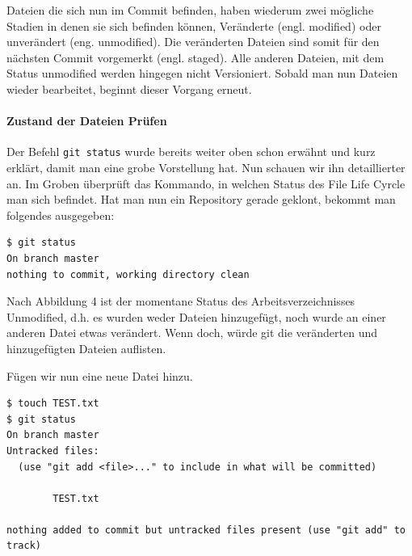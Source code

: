 \documentclass[12pt,a4paper,bibliography=totocnumbered,listof=totocnumbered]{scrartcl}
\begin{document}
Dateien die sich nun im Commit befinden, haben wiederum zwei mögliche Stadien in denen sie sich befinden können, Veränderte (engl. modified) oder unverändert (eng. unmodified). Die veränderten Dateien sind somit für den nächsten Commit vorgemerkt (engl. staged). Alle anderen Dateien, mit dem Status unmodified werden hingegen nicht Versioniert. Sobald man nun Dateien wieder bearbeitet, beginnt dieser Vorgang erneut.

\paragraph{Zustand der Dateien Prüfen}
Der Befehl \lstinline|git status| wurde bereits weiter oben schon erwähnt und kurz erklärt, damit man eine grobe Vorstellung hat. Nun schauen wir ihn detaillierter an. Im Groben überprüft das Kommando, in welchen Status des File Life Cyrcle man sich befindet. Hat man nun ein Repository gerade geklont, bekommt man folgendes ausgegeben:

\vspace{1em}
\begin{lstlisting}[caption=Git Statusbefehl nach git clone befehl, label=lst:arduino]
$ git status
On branch master
nothing to commit, working directory clean 
\end{lstlisting}

Nach Abbildung 4 ist der momentane Status des Arbeitsverzeichnisses Unmodified, d.h. 
es wurden weder Dateien hinzugefügt, noch wurde an einer anderen Datei etwas verändert. Wenn doch, würde git die veränderten und hinzugefügten Dateien auflisten.

Fügen wir nun eine neue Datei hinzu. 
\vspace{1em}
\begin{lstlisting}[caption=Git Statusbefehl nachdem erzeugen einer Datei, label=lst:arduino]
$ touch TEST.txt
$ git status
On branch master
Untracked files:
  (use "git add <file>..." to include in what will be committed)

        TEST.txt

nothing added to commit but untracked files present (use "git add" to track)

\end{lstlisting}
\end{document}
